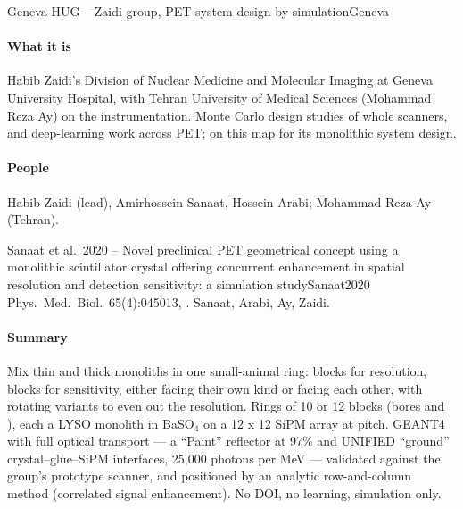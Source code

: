 \begin{programnote}{Geneva HUG -- Zaidi group, PET system design by simulation}{Geneva}

\paragraph{What it is}
Habib Zaidi's Division of Nuclear Medicine and Molecular Imaging at Geneva
University Hospital, with Tehran University of Medical Sciences (Mohammad Reza
Ay) on the instrumentation. Monte Carlo design studies of whole scanners, and
deep-learning work across PET; on this map for its monolithic system design.

\paragraph{People}
Habib Zaidi (lead), Amirhossein Sanaat, Hossein Arabi; Mohammad Reza Ay
(Tehran).

\begin{papernote}{Sanaat et al.\ 2020 -- Novel preclinical PET geometrical concept using a monolithic scintillator crystal offering concurrent enhancement in spatial resolution and detection sensitivity: a simulation study}{Sanaat2020}
Phys.\ Med.\ Biol.\ 65(4):045013, . Sanaat,
Arabi, Ay, Zaidi.

\paragraph{Summary}
Mix thin and thick monoliths in one small-animal ring:  blocks for
resolution,  blocks for sensitivity, either facing their own kind or
facing each other, with rotating variants to even out the resolution. Rings of
10 or 12 blocks (bores  and ), each a
 LYSO monolith in BaSO$_4$ on a 12 x 12 SiPM array
at  pitch. GEANT4 with full optical transport --- a ``Paint''
reflector at 97\% and UNIFIED ``ground'' crystal--glue--SiPM interfaces, 25{,}000 photons per MeV --- validated against the group's prototype
scanner, and positioned by an analytic row-and-column method (correlated signal
enhancement). No DOI, no learning, simulation only.


\end{papernote}
\end{programnote}

